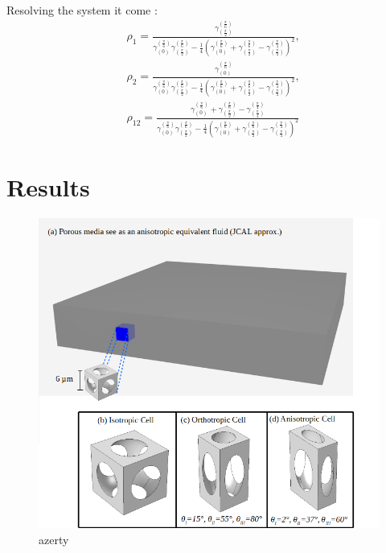 \documentclass{article}
\begin{document}
    Resolving the system it come :
    \begin{align}
        &\rho_1=\frac{\gamma^{(\frac{\pi}{6})}_{(\frac{\pi}{2})}}{\gamma^{(\frac{\pi}{6})}_{(0)}\gamma^{(\frac{\pi}{6})}_{(\frac{\pi}{2})}-\frac{1}{4}(\gamma^{(\frac{\pi}{6})}_{(0)}+\gamma^{(\frac{\pi}{6})}_{(\frac{\pi}{2})}-\gamma^{(\frac{\pi}{4})}_{(\frac{\pi}{4})})^2},\\
        &\rho_2=\frac{\gamma^{(\frac{\pi}{6})}_{(0)}}{\gamma^{(\frac{\pi}{6})}_{(0)}\gamma^{(\frac{\pi}{6})}_{(\frac{\pi}{2})}-\frac{1}{4}(\gamma^{(\frac{\pi}{6})}_{(0)}+\gamma^{(\frac{\pi}{6})}_{(\frac{\pi}{2})}-\gamma^{(\frac{\pi}{4})}_{(\frac{\pi}{4})})^2},\\
        &\rho_{12}=\frac{\gamma^{(\frac{\pi}{6})}_{(0)}+\gamma^{(\frac{\pi}{6})}_{(\frac{\pi}{2})}-\gamma^{(\frac{\pi}{4})}_{(\frac{\pi}{4})}}{\gamma^{(\frac{\pi}{6})}_{(0)}\gamma^{(\frac{\pi}{6})}_{(\frac{\pi}{2})}-\frac{1}{4}(\gamma^{(\frac{\pi}{6})}_{(0)}+\gamma^{(\frac{\pi}{6})}_{(\frac{\pi}{2})}-\gamma^{(\frac{\pi}{4})}_{(\frac{\pi}{4})})^2}
    \end{align}
    
    
\section{Results}
    
    \begin{figure}[ht]
        \centering
        \includegraphics[scale=0.5]{Material_2.png}
        \caption{azerty}
        \label{Material}
    \end{figure}
\end{document}
